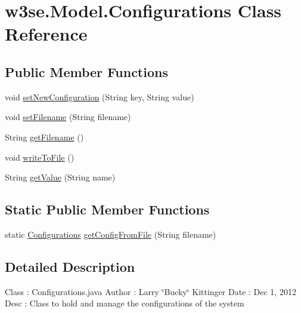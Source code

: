 \hypertarget{classw3se_1_1_model_1_1_configurations}{\section{w3se.\-Model.\-Configurations Class Reference}
\label{classw3se_1_1_model_1_1_configurations}
}
\subsection*{Public Member Functions}
\begin{DoxyCompactItemize}
\item 
void \hyperlink{classw3se_1_1_model_1_1_configurations_aeb9faee19cbeea055e08b439c8b4093b}{set\-New\-Configuration} (String key, String value)
\item 
void \hyperlink{classw3se_1_1_model_1_1_configurations_ae520d41d684af1caf3f8abbcb63122df}{set\-Filename} (String filename)
\item 
String \hyperlink{classw3se_1_1_model_1_1_configurations_ac879ff8cf969d830f2244f65c175ca95}{get\-Filename} ()
\item 
void \hyperlink{classw3se_1_1_model_1_1_configurations_a38775b5fff99e05d010396a6799eff21}{write\-To\-File} ()
\item 
String \hyperlink{classw3se_1_1_model_1_1_configurations_a57857b6a9517790bd58934cb6ee9e0a4}{get\-Value} (String name)
\end{DoxyCompactItemize}
\subsection*{Static Public Member Functions}
\begin{DoxyCompactItemize}
\item 
static \hyperlink{classw3se_1_1_model_1_1_configurations}{Configurations} \hyperlink{classw3se_1_1_model_1_1_configurations_a801e4a5535bc378aa3d3eb11a90923f8}{get\-Config\-From\-File} (String filename)
\end{DoxyCompactItemize}


\subsection{Detailed Description}
Class \-: Configurations.\-java Author \-: Larry \char`\"{}\-Bucky\char`\"{} Kittinger Date \-: Dec 1, 2012 Desc \-: Class to hold and manage the configurations of the system 

